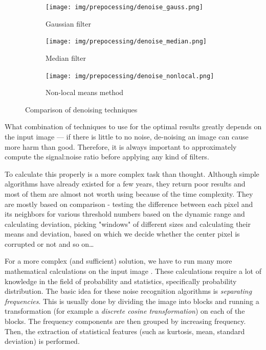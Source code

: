\begin{figure}[H]
\hspace*{\fill} %
\begin{subfigure}{0.31\textwidth}
\texttt{[image: img/prepocessing/denoise\_gauss.png]}
\caption{Gaussian filter} \label{fig:1a}
\end{subfigure}
\hspace*{\fill} %
\begin{subfigure}{0.31\textwidth}
\texttt{[image: img/prepocessing/denoise\_median.png]}
\caption{Median filter} \label{fig:1b}
\end{subfigure}
\hspace*{\fill} %
\begin{subfigure}{0.31\textwidth}
\texttt{[image: img/prepocessing/denoise\_nonlocal.png]}
\caption{Non-local means method} \label{fig:1c}
\end{subfigure}
\caption{Comparison of denoising techniques} \label{fig:1}
\end{figure}

What combination of techniques to use for the optimal results greatly depends on the input image --- if there is little to no noise, de-noising an image can cause more harm than good. Therefore, it is always important to approximately compute the signal:noise ratio before applying any kind of filters.


To calculate this properly is a more complex task than thought. Although simple algorithms have already existed for a few years, they return poor results and most of them are almost not worth using because of the time complexity. They are mostly based on comparison - testing the difference between each pixel and its neighbors for various threshold numbers based on the dynamic range and calculating deviation, picking "windows" of different sizes and calculating their means and deviation, based on which we decide whether the center pixel is corrupted or not and so on\ldots

For a more complex (and sufficient) solution, we have to run many more mathematical calculations on the input image \citep{noiseDetection}. These calculations require a lot of knowledge in the field of probability and statistics, specifically probability distribution. The basic idea for these noise recognition algorithms is \emph{separating frequencies}. This is usually done by dividing the image into blocks and running a transformation (for example a \emph{discrete cosine transformation}) on each of the blocks. The frequency components are then grouped by increasing frequency. Then, the extraction of statistical features (such as kurtosis, mean, standard deviation) is performed.

